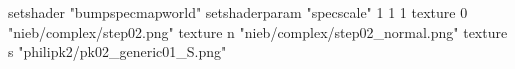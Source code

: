 setshader "bumpspecmapworld"
setshaderparam "specscale" 1 1 1
    texture 0 "nieb/complex/step02.png"
    texture n "nieb/complex/step02_normal.png"
    texture s "philipk2/pk02_generic01_S.png"